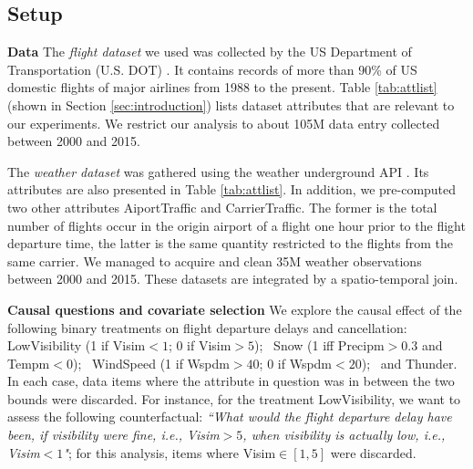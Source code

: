 \subsection{Setup}
\label{sec:setup}


{\bf Data} The {\em flight dataset} we used was collected by the US
Department of Transportation (U.S. DOT) \cite{flightdata}. It contains
records of more than 90\% of US domestic flights of major airlines
from 1988 to the present. Table \ref{tab:attlist}(shown in Section
\ref{sec:introduction}) lists dataset attributes that are relevant to
our experiments.  We restrict our analysis to about 105M data entry
collected between 2000 and 2015.

The {\em weather dataset} was gathered using the weather underground
API \cite{Weatherdata}.  Its attributes are also presented in Table
\ref{tab:attlist}. In addition, we pre-computed two other attributes
AiportTraffic and CarrierTraffic. The former is the total number of
flights occur in the origin airport of a flight one hour prior to the
flight departure time, the latter is the same quantity restricted to
the flights from the same carrier.  We managed to acquire and clean
35M weather observations between 2000 and 2015. These datasets are
integrated by a spatio-temporal join.















{\bf Causal questions and covariate selection} We explore the causal
effect of the following binary treatments on flight departure delays
and cancellation: LowVisibility (1 if Visim$<1$; 0 if Visim$>5$); \
Snow (1 iff Precipm$>0.3$ and Tempm$<0$); \ WindSpeed (1 if
Wspdm$>40$; 0 if Wspdm$<20$); \ and Thunder.  In each case, data items
where the attribute in question was in between the two bounds were
discarded.  For instance, for the treatment LowVisibility, we want to
assess the following counterfactual: {\em ``What would the flight
  departure delay have been, if visibility were fine, i.e., Visim$>5$,
  when visibility is actually low, i.e., Visim$<1$"}; for this
analysis, items where Visim$\in[1,5]$ were discarded.


